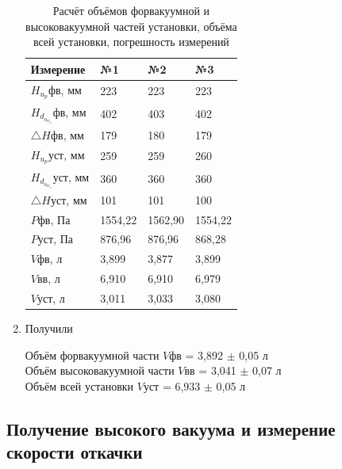 \documentclass[a4paper]{article}
\begin{document}
\begin{enumerate}
    
    \begin{table}[t]
    \centering
    \begin{center}
    \caption{Расчёт объёмов форвакуумной и высоковакуумной частей установки, объёма всей установки, погрешность измерений}
    \end{center}
    \vspace{0.1cm}
    \label{tab:my_label}
    \begin{tabular}{ |p{2.5cm}||p{1.5cm}|p{1.5cm}|p{1.5cm}|  }
 \hline
 Измерение & №1 & №2 & №3\\
\hline 

 $H_u_p$фв, мм & 223 & 223 & 223 \\
 $H_d_o_w_n$фв, мм& 402 & 403 & 402 \\
 $\triangle H$фв, мм & 179 & 180 & 179 \\
 $H_u_p$уст, мм & 259 & 259 & 260 \\
 $H_d_o_w_n$уст, мм& 360 & 360 & 360 \\
 $\triangle H$уст, мм & 101 & 101 & 100 \\
 $P$фв, Па & 1554,22 & 1562,90 & 1554,22 \\
 $P$уст, Па & 876,96 & 876,96 & 868,28 \\
 $V$фв, л & 3,899 & 3,877 & 3,899 \\
 $V$вв, л & 6,910 & 6,910 & 6,979 \\
 $V$уст, л & 3,011 & 3,033 & 3,080 \\
 \hline
\end{tabular}

\end{table}

\item Получили 
\begin{center}
Объём форвакуумной части $V$фв = 3,892 $\pm$ 0,05 л\\
Объём высоковакуумной части $V$вв = 3,041 $\pm$ 0,07 л\\
Объём всей установки $V$уст = 6,933 $\pm$ 0,05 л\\
\end{center}

\end{enumerate}
\newpage

\subsection{Получение высокого вакуума и измерение скорости откачки}
\end{document}
